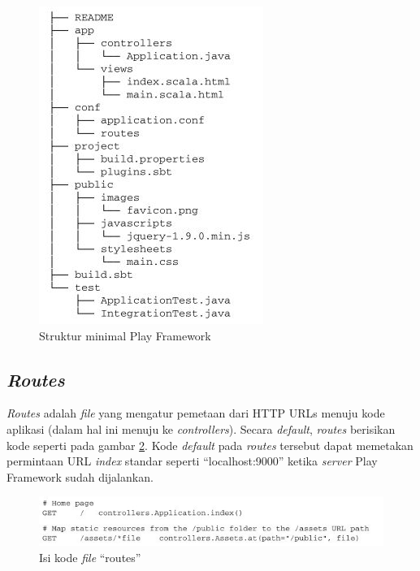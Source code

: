\begin{figure}[htbp]
	\centering
		\includegraphics[scale=0.7]{Gambar/2_strukturplay.JPG}
	\caption{Struktur minimal Play Framework}
	\label{fig:2_strukturplay}
\end{figure}

\subsection{\textit{Routes}}
\label{sec:routes}
\textit{Routes} adalah \textit{file} yang mengatur pemetaan dari HTTP URLs menuju kode aplikasi (dalam hal ini menuju ke \textit{controllers}). Secara \textit{default}, \textit{routes} berisikan kode seperti pada gambar \ref{fig:2_routes1}. Kode \textit{default} pada \textit{routes} tersebut dapat memetakan permintaan URL \textit{index} standar seperti ``localhost:9000'' ketika \textit{server} Play Framework sudah dijalankan.

\begin{figure}[htbp]
	\centering
		\includegraphics[scale=0.8]{Gambar/2_routes1.JPG}
	\caption{Isi kode \textit{file} ``routes''\cite{playforjava}}
	\label{fig:2_routes1}
\end{figure}

